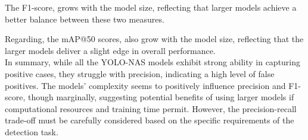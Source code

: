 The F1-score, grows with the model size, reflecting that larger models achieve a better balance between these two measures.

Regarding, the mAP@50 scores, also grow with the model size, reflecting that the larger models deliver a slight edge in overall performance.\\

In summary, while all the YOLO-NAS models exhibit
strong ability in capturing positive cases, they struggle with precision, indicating a high level of false positives. The models’ complexity seems to positively influence precision and F1-score, though marginally, suggesting potential benefits of
using larger models if computational resources and training time permit. However, the precision-recall trade-off must be carefully considered based on the specific requirements of the detection task.

